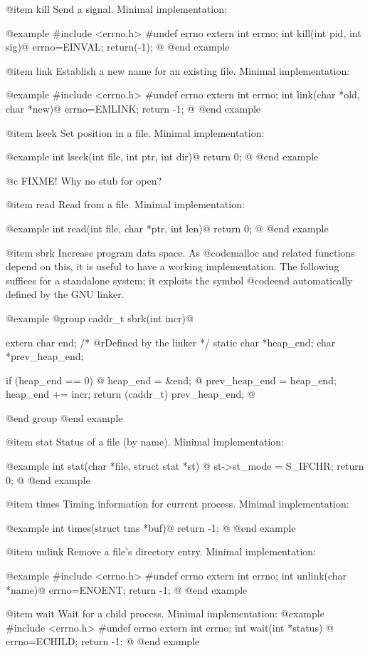@item kill
Send a signal.  Minimal implementation:

@example
#include <errno.h>
#undef errno
extern int errno;
int kill(int pid, int sig)@{
  errno=EINVAL;
  return(-1);
@}
@end example

@item link
Establish a new name for an existing file.  Minimal implementation:

@example
#include <errno.h>
#undef errno
extern int errno;
int link(char *old, char *new)@{
  errno=EMLINK;
  return -1;
@}
@end example

@item lseek
Set position in a file.  Minimal implementation:

@example
int lseek(int file, int ptr, int dir)@{
    return 0;
@}
@end example

@c FIXME! Why no stub for open?

@item read
Read from a file.  Minimal implementation:

@example
int read(int file, char *ptr, int len)@{
    return 0;
@}
@end example

@item sbrk
Increase program data space.  As @code{malloc} and related functions
depend on this, it is useful to have a working implementation.  The
following suffices for a standalone system; it exploits the symbol
@code{end} automatically defined by the GNU linker.

@example
@group
caddr_t sbrk(int incr)@{
  extern char end;		/* @r{Defined by the linker} */
  static char *heap_end;
  char *prev_heap_end;
 
  if (heap_end == 0) @{
    heap_end = &end;
  @}
  prev_heap_end = heap_end;
  heap_end += incr;
  return (caddr_t) prev_heap_end;
@}
@end group
@end example

@item stat
Status of a file (by name).  Minimal implementation:

@example
int stat(char *file, struct stat *st) @{
  st->st_mode = S_IFCHR;
  return 0;
@}
@end example

@item times
Timing information for current process.  Minimal implementation:

@example
int times(struct tms *buf)@{
  return -1;
@}
@end example

@item unlink
Remove a file's directory entry.  Minimal implementation:

@example
#include <errno.h>
#undef errno
extern int errno;
int unlink(char *name)@{
  errno=ENOENT;
  return -1; 
@}
@end example

@item wait
Wait for a child process.  Minimal implementation:
@example
#include <errno.h>
#undef errno
extern int errno;
int wait(int *status) @{
  errno=ECHILD;
  return -1;
@}
@end example

